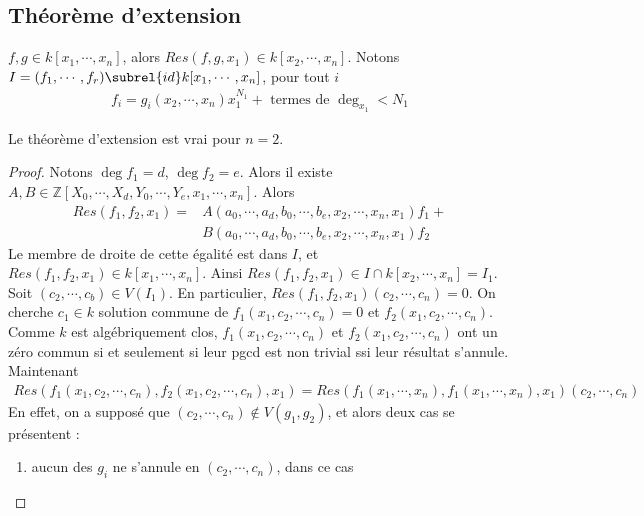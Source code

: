         \subsection{Théorème d'extension}
            $f,g \in k[x_1, \cdots, x_n]$, alors $Res(f,g,x_1) \in k[x_2, \cdots, x_n]$. Notons $I = (f_1, \cdots, f_r) \subrel{id} k[x_1, \cdots, x_n]$, pour tout $i$
            \begin{align*}
                f_i = g_i(x_2, \cdots, x_n) x_1^{N_1} + \text{ termes de } \deg_{x_1} < N_1
            \end{align*}
            \begin{lemm}
                \label{lemm161}
                Le théorème d'extension est vrai pour $n = 2$.
            \end{lemm}
            \begin{proof}
                Notons $\deg f_1 = d$, $\deg f_2 = e$. Alors il existe $A,B \in \mathbb{Z}[X_0, \cdots, X_d, Y_0, \cdots, Y_e, x_1, \cdots, x_n]$. Alors
                \begin{align*}
                    Res(f_1, f_2, x_1) = &A(a_0, \cdots, a_d, b_0, \cdots, b_e, x_2, \cdots, x_n, x_1) f_1 + \\
                    &B(a_0, \cdots, a_d, b_0, \cdots, b_e, x_2, \cdots, x_n, x_1) f_2
                \end{align*}
                Le membre de droite de cette égalité est dans $I$, et $Res(f_1, f_2, x_1) \in k[x_1, \cdots, x_n]$. Ainsi $Res(f_1, f_2, x_1) \in I \cap k[x_2, \cdots, x_n] = I_1$. Soit $(c_2, \cdots, c_b) \in V(I_1)$. En particulier, $Res(f_1, f_2, x_1)(c_2, \cdots, c_n) = 0$. On cherche $c_1 \in k$ solution commune de $f_1(x_1, c_2, \cdots, c_n) = 0$ et $f_2(x_1, c_2, \cdots, c_n)$. Comme $k$ est algébriquement clos, $f_1(x_1, c_2, \cdots, c_n)$ et $f_2(x_1, c_2, \cdots, c_n)$ ont un zéro commun si et seulement si leur pgcd est non trivial ssi leur résultat s'annule. Maintenant 
                \begin{align*}
                    Res(f_1(x_1, c_2, \cdots, c_n), f_2(x_1, c_2, \cdots, c_n), x_1) = Res(f_1(x_1, \cdots, x_n), f_1(x_1, \cdots, x_n), x_1)(c_2, \cdots, c_n)
                \end{align*}
                En effet, on a supposé que $(c_2, \cdots, c_n) \notin V(g_1, g_2)$, et alors deux cas se présentent : 
                \begin{enumerate}
                    \item aucun des $g_i$ ne s'annule en $(c_2, \cdots, c_n)$, dans ce cas

\end{enumerate}
\end{proof}

